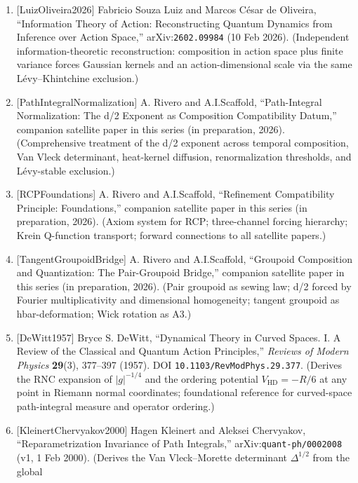 \documentclass[
]{article}
\begin{document}
\begin{enumerate}
  measurement pairs plus continuity --- kinematic complement to the
  dynamical forcing in P4.2.)
\item
  {[}LuizOliveira2026{]} Fabricio Souza Luiz and Marcos César de
  Oliveira, ``Information Theory of Action: Reconstructing Quantum
  Dynamics from Inference over Action Space,'' arXiv:\texttt{2602.09984}
  (10 Feb 2026). (Independent information-theoretic reconstruction:
  composition in action space plus finite variance forces Gaussian
  kernels and an action-dimensional scale via the same Lévy--Khintchine
  exclusion.)
\item
  {[}PathIntegralNormalization{]} A. Rivero and A.I.Scaffold,
  ``Path-Integral Normalization: The d/2 Exponent as Composition
  Compatibility Datum,'' companion satellite paper in this series (in
  preparation, 2026). (Comprehensive treatment of the d/2 exponent
  across temporal composition, Van Vleck determinant, heat-kernel
  diffusion, renormalization thresholds, and Lévy-stable exclusion.)
\item
  {[}RCPFoundations{]} A. Rivero and A.I.Scaffold, ``Refinement
  Compatibility Principle: Foundations,'' companion satellite paper in
  this series (in preparation, 2026). (Axiom system for RCP;
  three-channel forcing hierarchy; Krein Q-function transport; forward
  connections to all satellite papers.)
\item
  {[}TangentGroupoidBridge{]} A. Rivero and A.I.Scaffold, ``Groupoid
  Composition and Quantization: The Pair-Groupoid Bridge,'' companion
  satellite paper in this series (in preparation, 2026). (Pair groupoid
  as sewing law; d/2 forced by Fourier multiplicativity and dimensional
  homogeneity; tangent groupoid as hbar-deformation; Wick rotation as
  A3.)
\item
  {[}DeWitt1957{]} Bryce S. DeWitt, ``Dynamical Theory in Curved Spaces.
  I. A Review of the Classical and Quantum Action Principles,''
  \emph{Reviews of Modern Physics} \textbf{29}(3), 377--397 (1957). DOI
  \texttt{10.1103/RevModPhys.29.377}. (Derives the RNC expansion of
  \(|g|^{-1/4}\) and the ordering potential \(V_{\mathrm{HD}}=-R/6\) at
  any point in Riemann normal coordinates; foundational reference for
  curved-space path-integral measure and operator ordering.)
\item
  {[}KleinertChervyakov2000{]} Hagen Kleinert and Aleksei Chervyakov,
  ``Reparametrization Invariance of Path Integrals,''
  arXiv:\texttt{quant-ph/0002008} (v1, 1 Feb 2000). (Derives the Van
  Vleck--Morette determinant \(\Delta^{1/2}\) from the global

\end{enumerate}
\end{document}
